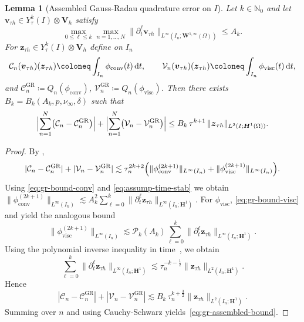 \documentclass[DIV=16]{scrartcl}
\newtheorem{lemma}[theorem]{Lemma}
\newcommand{\uu}{\boldsymbol v}
\renewcommand{\vv}{\boldsymbol z}
\newcommand{\It}{I}
\newcommand{\In}{I_n}
\newcommand{\dt}{\partial_t}
\newcommand{\drv}{\mkern3mu\mathrm{d}}
\newcommand{\Dt}{\drv t}
\newcommand{\Vh}{\boldsymbol V_h}
\newcommand{\reg}{\delta}
\newcommand{\pn}{p}
\begin{document}
\begin{lemma}[Assembled Gauss-Radau quadrature error on $\It$]\label{lem:gr-assembled}
Let $k\in\mathbb N_0$ and let $\uu_{\tau h}\in Y_\tau^k(\It)\otimes\Vh$ satisfy
\begin{equation}\label{eq:assump-time-stab}
\max_{0\le \ell\le k}\max_{n=1,\dots,N}
\|\dt^\ell\uu_{\tau h}\|_{L^\infty(\In;\boldsymbol W^{1,\infty}(\Omega))}
\le A_k.
\end{equation}
For $\vv_{\tau h}\in Y_\tau^k(\It)\otimes\Vh$ define on $\In$
\[
  \mathcal C_n(\uu_{\tau h})(\vv_{\tau h})\coloneq\int_{\In}\phi_{\mathrm{conv}}(t)\Dt,
  \qquad
  \mathcal V_n(\uu_{\tau h})(\vv_{\tau h})\coloneq\int_{\In}\phi_{\mathrm{visc}}(t)\Dt,
\]
and $\mathcal C_n^{\mathrm{GR}}\coloneq Q_n(\phi_{\mathrm{conv}})$,
$\mathcal V_n^{\mathrm{GR}}\coloneq Q_n(\phi_{\mathrm{visc}})$.
Then there exists $B_k=B_k(A_k,\pn,\nu_\infty,\reg)$ such that
\begin{equation}\label{eq:gr-assembled-bound}
\Bigl|\sum_{n=1}^N\bigl(\mathcal C_n-\mathcal C_n^{\mathrm{GR}}\bigr)\Bigr|
+\Bigl|\sum_{n=1}^N\bigl(\mathcal V_n-\mathcal V_n^{\mathrm{GR}}\bigr)\Bigr|
\le B_k\,\tau^{k+1}\,\|\vv_{\tau h}\|_{L^2(\It;\boldsymbol H^1(\Omega))}.
\end{equation}
\end{lemma}
\begin{proof}
By ,
\[
  |\mathcal C_n-\mathcal C_n^{\mathrm{GR}}|+|\mathcal V_n-\mathcal V_n^{\mathrm{GR}}|
  \lesssim \tau_n^{2k+2}\Bigl(\|\phi_{\mathrm{conv}}^{(2k+1)}\|_{L^\infty(\In)}+\|\phi_{\mathrm{visc}}^{(2k+1)}\|_{L^\infty(\In)}\Bigr).
\]
Using \eqref{eq:gr-bound-conv} and \eqref{eq:assump-time-stab} we obtain
$\|\phi_{\mathrm{conv}}^{(2k+1)}\|_{L^\infty(\In)}\lesssim A_k^2
\sum_{\ell=0}^k\|\dt^\ell\vv_{\tau h}\|_{L^\infty(\In;\boldsymbol H^1)}$.
For $\phi_{\mathrm{visc}}$, \eqref{eq:gr-bound-visc} and  yield the analogous bound
\[
\|\phi_{\mathrm{visc}}^{(2k+1)}\|_{L^\infty(\In)}
\lesssim \mathcal P_k(A_k)\sum_{\ell=0}^k\|\dt^\ell\vv_{\tau h}\|_{L^\infty(\In;\boldsymbol H^1)}.
\]
Using the polynomial inverse inequality in time~\cite[(3.28)]{KarakashianMakridakis1998}, we obtain
\[
\sum_{\ell=0}^k\|\dt^\ell\vv_{\tau h}\|_{L^\infty(\In;\boldsymbol H^1)}
\lesssim \tau_n^{-k-\frac12}\|\vv_{\tau h}\|_{L^2(\In;\boldsymbol H^1)}.
\]
Hence
\[
|\mathcal C_n-\mathcal C_n^{\mathrm{GR}}|+|\mathcal V_n-\mathcal V_n^{\mathrm{GR}}|
\lesssim B_k\,\tau_n^{k+\frac32}\|\vv_{\tau h}\|_{L^2(\In;\boldsymbol H^1)}.
\]
Summing over $n$ and using Cauchy-Schwarz yields~\eqref{eq:gr-assembled-bound}.
\end{proof}
\end{document}
